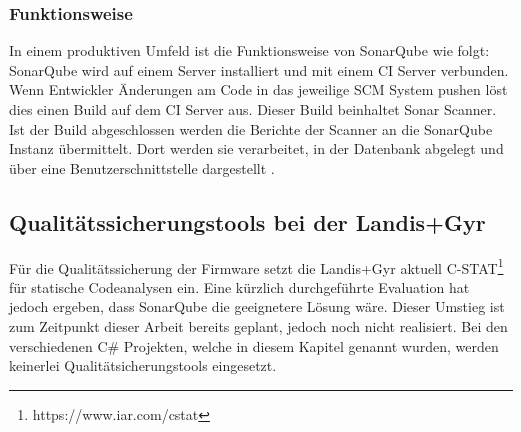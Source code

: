 
\subsubsection{Funktionsweise}\label{sonar:funktionsweise}
In einem produktiven Umfeld ist die Funktionsweise von SonarQube wie folgt:
SonarQube wird auf einem Server installiert und mit einem \ac{CI} Server verbunden.
Wenn Entwickler Änderungen am Code in das jeweilige \ac{SCM} System pushen löst dies einen Build auf dem \ac{CI} Server aus.
Dieser Build beinhaltet Sonar Scanner.
Ist der Build abgeschlossen werden die Berichte der Scanner an die SonarQube Instanz übermittelt.
Dort werden sie verarbeitet, in der Datenbank abgelegt und über eine Benutzerschnittstelle dargestellt \parencite{malloy_2021}.

\subsection{Qualitätssicherungstools bei der Landis+Gyr}
Für die Qualitätssicherung der Firmware setzt die Landis+Gyr aktuell C-STAT\footnote{https://www.iar.com/cstat} für statische Codeanalysen ein.
Eine kürzlich durchgeführte Evaluation hat jedoch ergeben, dass SonarQube die geeignetere Lösung wäre.
Dieser Umstieg ist zum Zeitpunkt dieser Arbeit bereits geplant, jedoch noch nicht realisiert.
Bei den verschiedenen C\# Projekten, welche in diesem Kapitel genannt wurden, werden keinerlei Qualitätsicherungstools eingesetzt.
